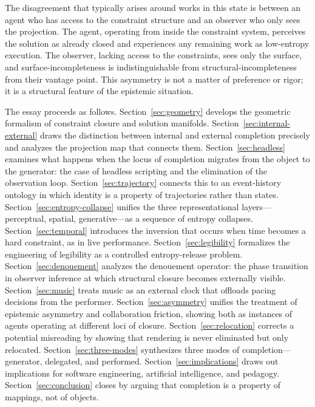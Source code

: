 \documentclass[11pt, twoside]{article}
\theoremstyle{plain}
\theoremstyle{definition}
\theoremstyle{remark}
\begin{document}
The disagreement that typically arises around works in this state is between an agent who has access to the constraint structure and an observer who only sees the projection. The agent, operating from inside the constraint system, perceives the solution as already closed and experiences any remaining work as low-entropy execution. The observer, lacking access to the constraints, sees only the surface, and surface-incompleteness is indistinguishable from structural-incompleteness from their vantage point. This asymmetry is not a matter of preference or rigor; it is a structural feature of the epistemic situation.

The essay proceeds as follows. Section~\ref{sec:geometry} develops the geometric formalism of constraint closure and solution manifolds. Section~\ref{sec:internal-external} draws the distinction between internal and external completion precisely and analyzes the projection map that connects them. Section~\ref{sec:headless} examines what happens when the locus of completion migrates from the object to the generator: the case of headless scripting and the elimination of the observation loop. Section~\ref{sec:trajectory} connects this to an event-history ontology in which identity is a property of trajectories rather than states. Section~\ref{sec:entropy-collapse} unifies the three representational layers---perceptual, spatial, generative---as a sequence of entropy collapses. Section~\ref{sec:temporal} introduces the inversion that occurs when time becomes a hard constraint, as in live performance. Section~\ref{sec:legibility} formalizes the engineering of legibility as a controlled entropy-release problem. Section~\ref{sec:denouement} analyzes the denouement operator: the phase transition in observer inference at which structural closure becomes externally visible. Section~\ref{sec:music} treats music as an external clock that offloads pacing decisions from the performer. Section~\ref{sec:asymmetry} unifies the treatment of epistemic asymmetry and collaboration friction, showing both as instances of agents operating at different loci of closure. Section~\ref{sec:relocation} corrects a potential misreading by showing that rendering is never eliminated but only relocated. Section~\ref{sec:three-modes} synthesizes three modes of completion---generator, delegated, and performed. Section~\ref{sec:implications} draws out implications for software engineering, artificial intelligence, and pedagogy. Section~\ref{sec:conclusion} closes by arguing that completion is a property of mappings, not of objects.
\end{document}
